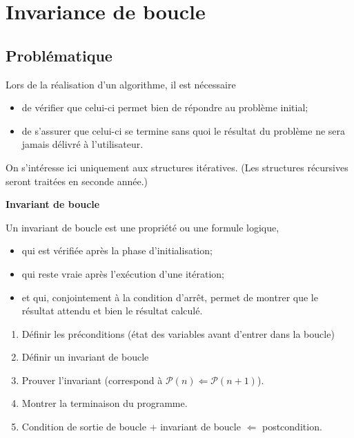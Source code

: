 \documentclass[11pt,oneside]{article}
\begin{document}
\section{Invariance de boucle}
\subsection{Problématique}
Lors de la réalisation d'un algorithme, il est nécessaire
\begin{itemize} 
\item de vérifier que celui-ci permet bien de répondre au problème initial;
\item de s'assurer que celui-ci se termine sans quoi le résultat du problème ne sera jamais délivré à l'utilisateur.
\end{itemize}

On s'intéresse ici uniquement aux structures itératives. (Les structures récursives seront traitées en seconde année.)

\begin{defi}
\textbf{Invariant de boucle \cite{denis}}

Un invariant de boucle est une propriété ou une formule logique, 
\begin{itemize}
\item qui est vérifiée après la phase d'initialisation;
\item qui reste vraie après l'exécution d'une itération;
\item et qui, conjointement à la condition d'arrêt, permet de montrer que le résultat attendu et bien le résultat calculé. 
\end{itemize}
\end{defi}


\begin{methode}
\cite{soyeur}
\begin{enumerate}
\item Définir les préconditions (état des variables avant d’entrer dans la boucle)
\item Définir un invariant de boucle
\item Prouver l’invariant (correspond à $\mathcal{P}(n) \Longleftarrow \mathcal{P}(n + 1)$).
\item Montrer la terminaison du programme.
\item Condition de sortie de boucle + invariant de boucle $\Longleftarrow$ postcondition.
\end{enumerate}
\end{methode}
\end{document}
